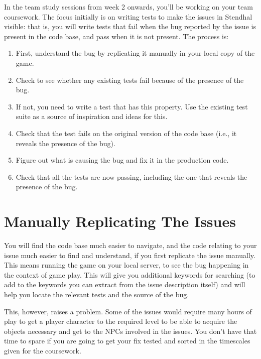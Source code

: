 \documentclass[
]{book}
\providecommand{\tightlist}{%
  \setlength{\itemsep}{0pt}\setlength{\parskip}{0pt}}
\begin{document}
In the team study sessions from week 2 onwards, you'll be working on your team coursework. The focus initially is on writing tests to make the issues in Stendhal visible: that is, you will write tests that fail when the bug reported by the issue is present in the code base, and pass when it is not present. The process is:

\begin{enumerate}
\def\labelenumi{\arabic{enumi}.}
\tightlist
\item
  First, understand the bug by replicating it manually in your local copy of the game.
\item
  Check to see whether any existing tests fail because of the presence of the bug.
\item
  If not, you need to write a test that has this property. Use the existing test suite as a source of inspiration and ideas for this.
\item
  Check that the test fails on the original version of the code base (i.e., it reveals the presence of the bug).
\item
  Figure out what is causing the bug and fix it in the production code.
\item
  Check that all the tests are now passing, including the one that reveals the presence of the bug.
\end{enumerate}

\hypertarget{replicatingissues}{%
\section{Manually Replicating The Issues}\label{replicatingissues}}

You will find the code base much easier to navigate, and the code relating to your issue much easier to find and understand, if you first replicate the issue manually. This means running the game on your local server, to see the bug happening in the context of game play. This will give you additional keywords for searching (to add to the keywords you can extract from the issue description itself) and will help you locate the relevant tests and the source of the bug.

This, however, raises a problem. Some of the issues would require many hours of play to get a player character to the required level to be able to acquire the objects necessary and get to the NPCs involved in the issues. You don't have that time to spare if you are going to get your fix tested and sorted in the timescales given for the coursework.
\end{document}
